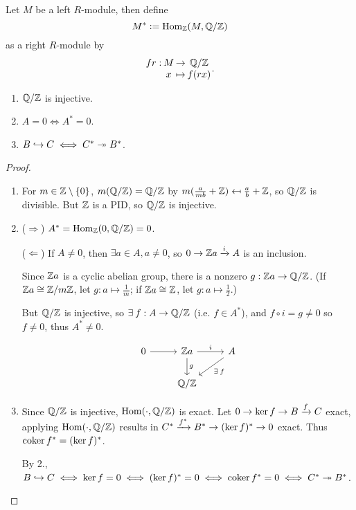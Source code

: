 \begin{definition}
  Let $M$ be a left $R$-module, then define
  $$M^* \vcentcolon= \operatorname{Hom}_{\mathbb{Z}}(M, \mathbb{Q}/\mathbb{Z})$$
  as a right $R$-module by 
  $$\deffunc{fr}{M}{\Qb/\Zb}{x}{f(rx)}.$$
\end{definition}

\begin{fact} \mbox{}
  \begin{enumerate}
    \item $\mathbb{Q}/\mathbb{Z}$ is injective.
    \item $A = 0 \iff A^* = 0$.
    \item $B \hookrightarrow C \iff C^* \twoheadrightarrow B^*$.
  \end{enumerate}

  \begin{proof} \mbox{}
    \begin{enumerate}
      \item 
        For $m \in \mathbb{Z} \setminus \lbrace0\rbrace$, $m(\mathbb{Q}/\mathbb{Z}) = \mathbb{Q}/\mathbb{Z}$ by 
        $m(\frac{a}{mb} + \mathbb{Z}) \mapsfrom \frac{a}{b} + \mathbb{Z}$, so $\mathbb{Q}/\mathbb{Z}$ is divisible.
        But $\mathbb{Z}$ is a PID, so $\mathbb{Q}/\mathbb{Z}$ is injective.

      \item ($\Rightarrow$)
        $A^* = \operatorname{Hom}_{\mathbb{Z}}(0, \mathbb{Q}/\mathbb{Z}) = 0$.

        ($\Leftarrow$)
        If $A \neq 0$, then $\exists a \in A, a \neq 0$, so $0 \to \mathbb{Z} a \xrightarrow{i} A$ is an inclusion.

        Since $\mathbb{Z} a$ is a cyclic abelian group, there is a nonzero $g : \mathbb{Z} a \to \mathbb{Q}/\mathbb{Z}$.
        (If $\mathbb{Z} a \cong \mathbb{Z}/m\mathbb{Z}$, let $g : a \mapsto \frac{1}{m}$; 
        if $\mathbb{Z} a \cong \mathbb{Z}$, let $g : a \mapsto \frac{1}{2}$.)

        But $\mathbb{Q}/\mathbb{Z}$ is injective, so $\exists f : A \to \Qb/\Zb$ (i.e.
        $f \in A^*$), and $f \circ i = g \neq 0$ so $f \neq 0$, thus $A^* \neq 0$.

        $$
        \begin{tikzcd}
          0 \ar[r] & \Zb a \ar[r, "i"] \ar[d, "g"] & A \ar[ld, "\exists f"] \\
                   & \Qb/\Zb 
        \end{tikzcd}
        $$

      \item 
        Since $\mathbb{Q}/\mathbb{Z}$ is injective, $\operatorname{Hom}(\cdot, \mathbb{Q}/\mathbb{Z})$ is exact.
        Let $0 \to \ker f \to B \xrightarrow{f} C$ exact, applying $\operatorname{Hom}(\cdot, \mathbb{Q}/\mathbb{Z})$
        results in
        $C^* \xrightarrow{f^*} B^* \to (\ker f)^* \to 0$ exact.
        Thus $\operatorname{coker} f^* = (\ker f)^*$.

        By 2., $B \hookrightarrow C \iff \ker f = 0 \iff (\ker f)^* = 0 \iff \operatorname{coker} f^* = 0 
        \iff C^* \twoheadrightarrow B^*$.
    \end{enumerate}
  \end{proof}
\end{fact}

